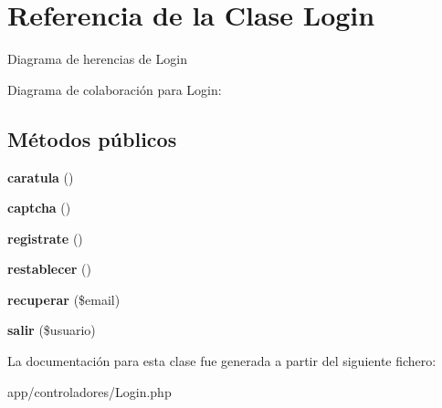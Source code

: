 \hypertarget{classLogin}{}\section{Referencia de la Clase Login}
\label{classLogin}


Diagrama de herencias de Login


Diagrama de colaboración para Login\+:
\subsection*{Métodos públicos}
\begin{DoxyCompactItemize}
\item 
\mbox{\label{classLogin_a82012d3b4918dd8880d55ab5f1279ee6}} 
{\bfseries caratula} ()
\item 
\mbox{\label{classLogin_a3b205f92844f5909ac5f757afebede6b}} 
{\bfseries captcha} ()
\item 
\mbox{\label{classLogin_a1fb936de46762f35a4e124b040bd2ab0}} 
{\bfseries registrate} ()
\item 
\mbox{\label{classLogin_a968de974d6e62b212989b60dc5d4619e}} 
{\bfseries restablecer} ()
\item 
\mbox{\label{classLogin_a55a820fdbf6b33a0653b60e809776fe0}} 
{\bfseries recuperar} (\$email)
\item 
\mbox{\label{classLogin_a02c2a5f41a4b30934652483be82d9eda}} 
{\bfseries salir} (\$usuario)
\end{DoxyCompactItemize}


La documentación para esta clase fue generada a partir del siguiente fichero\+:\begin{DoxyCompactItemize}
\item 
app/controladores/Login.\+php\end{DoxyCompactItemize}
